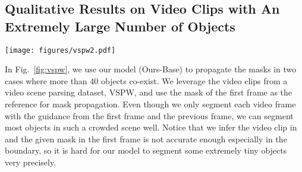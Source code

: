 \documentclass[sigconf]{acmart}
\begin{document}
\subsection{Qualitative Results on Video Clips with An Extremely Large Number of Objects}
\begin{figure*}[t]
	\centering
	\texttt{[image: figures/vspw2.pdf]}
\caption{We show two cases with an extremely large number of target objects to be segmented, including \textit{1001\_3iEIq5HBY1s} with 44 objects (left) and \textit{1007\_YCTBBdbKSSg} with 43 objects (right), from a video scene parsing dataset, VSPW \cite{miao2021vspw}. Even if our model (Ours-Base) only leverages the guidance from the first and the previous frame, it can handle such cases with an extremely large number of objects well. Please zoom in on the figure to view it better.}
	\label{fig:vspw}
\end{figure*} In Fig.~\ref{fig:vspw}, we use our model (Ours-Base) to propagate the masks in two cases where more than 40 objects co-exist. We leverage the video clips from a video scene parsing dataset, VSPW\cite{miao2021vspw}, and use the mask of the first frame as the reference for mask propagation. Even though we only segment each video frame with the guidance from the first frame and the previous frame, we can segment most objects in such a crowded scene well. Notice that we infer the video clip in  and the given mask in the first frame is not accurate enough especially in the boundary, so it is hard for our model to segment some extremely tiny objects very precisely.
\end{document}
